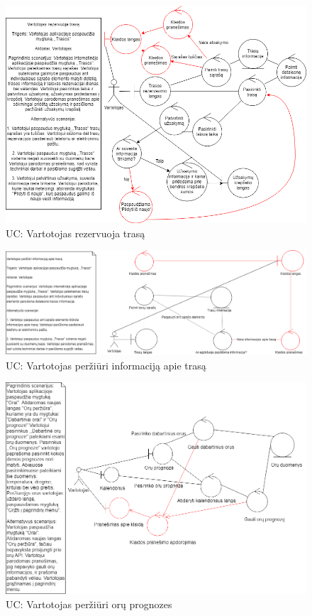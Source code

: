 \documentclass[oneside]{VUMIFPSkursinis}
\begin{document}
\begin{figure}[h]
    \centering
    \includegraphics[width=1.0\textwidth]{rob8.png}
    \caption{UC: Vartotojas rezervuoja trasą}
    \label{fig:rob8}
\end{figure}
\vskip 1cm

\begin{figure}[h]
    \centering
    \includegraphics[width=1.0\textwidth]{Rob9.png}
    \caption{UC: Vartotojas peržiūri informaciją apie trasą}
    \label{fig:rob9}
\end{figure}
\vskip 1cm

\begin{figure}[h]
    \centering
    \includegraphics[width=1.0\textwidth]{Rob10.png}
    \caption{UC: Vartotojas peržiūri orų prognozes}
    \label{fig:rob10}
\end{figure}
\vskip 1cm
\end{document}
